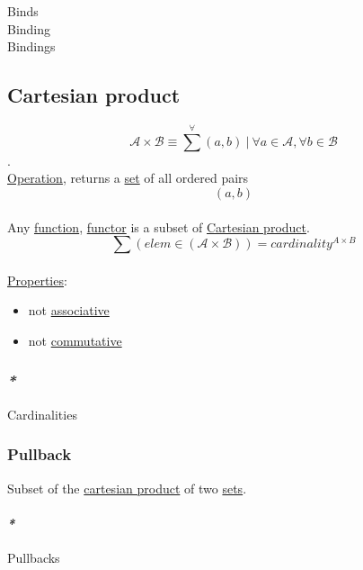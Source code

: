 \documentclass[11pt]{article}
\begin{document}
\label{orgdb14c59}Binds\\
\label{org6b75da3}Binding\\
\label{org6f5e9e4}Bindings\\

\subsection{\label{orgbaf1ac4}Cartesian product}
\label{sec:org4c8c70c}
$$ \mathcal{A} \times \mathcal{B} \equiv \sum^{\forall}{(a,b)} \ | \ \forall a \in \mathcal{A}, \forall b \in \mathcal{B} $$.\\
\hyperref[org1173fe8]{Operation}, returns a \hyperref[org1faf06d]{set} of all ordered pairs $$ (a, b) $$\\

Any \hyperref[orge15bc14]{function}, \hyperref[orgf2f6841]{functor} is a subset of \hyperref[orgbaf1ac4]{Cartesian product}.\\

$$ \sum{(elem \in (\mathcal{A} \times \mathcal{B}))}  = cardinality^{A \times B} $$\\

\hyperref[org85fb3a1]{Properties}:\\
\begin{itemize}
\item not \hyperref[orgbef8a27]{associative}\\
\item not \hyperref[orgb53f83d]{commutative}\\
\end{itemize}

\subsubsection{\emph{*}}
\label{sec:org72dc881}

\label{org55a87c3}Cardinalities\\

\subsubsection{\label{org4f99cc7}Pullback}
\label{sec:org1078716}
Subset of the \hyperref[orgbaf1ac4]{cartesian product} of two \hyperref[org58ec608]{sets}.\\

\paragraph{\emph{*}}
\label{sec:org8005b08}
\label{org7462806}Pullbacks\\
\end{document}

